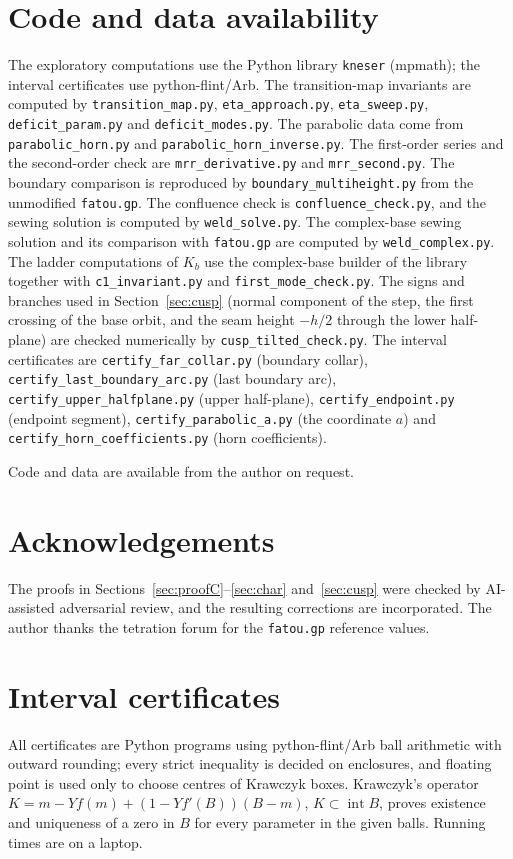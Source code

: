 \documentclass[11pt]{amsart}
\theoremstyle{definition}
\newcommand{\Kk}{K}
\begin{document}
\section*{Code and data availability}
{\small
The exploratory computations use the Python library \nolinkurl{kneser}
(mpmath); the interval certificates use python-flint/Arb.  The
transition-map invariants are computed by \nolinkurl{transition_map.py},
\nolinkurl{eta_approach.py}, \nolinkurl{eta_sweep.py}, \nolinkurl{deficit_param.py} and
\nolinkurl{deficit_modes.py}.  The parabolic data come from
\nolinkurl{parabolic_horn.py} and \nolinkurl{parabolic_horn_inverse.py}.  The
first-order series and the second-order check are \nolinkurl{mrr_derivative.py}
and \nolinkurl{mrr_second.py}.  The boundary comparison is reproduced by
\nolinkurl{boundary_multiheight.py} from the unmodified \nolinkurl{fatou.gp}.
The confluence check is \nolinkurl{confluence_check.py}, and the sewing solution is
computed by \nolinkurl{weld_solve.py}.  The complex-base sewing solution and its comparison with \nolinkurl{fatou.gp} are
computed by \nolinkurl{weld_complex.py}.  The ladder computations of $\Kk_b$ use the
complex-base builder of the library together with \nolinkurl{c1_invariant.py} and
\nolinkurl{first_mode_check.py}.  The signs and branches used in
Section~\ref{sec:cusp} (normal component of the step, the first crossing of
the base orbit, and the seam height $-h/2$ through the lower half-plane) are
checked numerically by \nolinkurl{cusp_tilted_check.py}.  The interval
certificates are \nolinkurl{certify_far_collar.py} (boundary collar),
\nolinkurl{certify_last_boundary_arc.py} (last boundary arc),
\nolinkurl{certify_upper_halfplane.py} (upper half-plane),
\nolinkurl{certify_endpoint.py} (endpoint segment),
\nolinkurl{certify_parabolic_a.py} (the coordinate $a$) and
\nolinkurl{certify_horn_coefficients.py} (horn coefficients).\par
Code and data are available from the author on request.\par
}

\section*{Acknowledgements}
The proofs in Sections~\ref{sec:proofC}--\ref{sec:char} and~\ref{sec:cusp} were
checked by AI-assisted adversarial review, and the resulting corrections are
incorporated.
The author thanks the tetration forum for the \texttt{fatou.gp} reference values.

\appendix
\section{Interval certificates}\label{app:cert}
All certificates are Python programs using python-flint/Arb ball arithmetic with
outward rounding; every strict inequality is decided on enclosures, and floating
point is used only to choose centres of Krawczyk boxes.  Krawczyk's operator
$K=m-Yf(m)+(1-Yf'(B))(B-m)$, $K\subset\operatorname{int}B$, proves existence and uniqueness of a zero in $B$
for every parameter in the given balls.  Running times are on a laptop.
\end{document}
